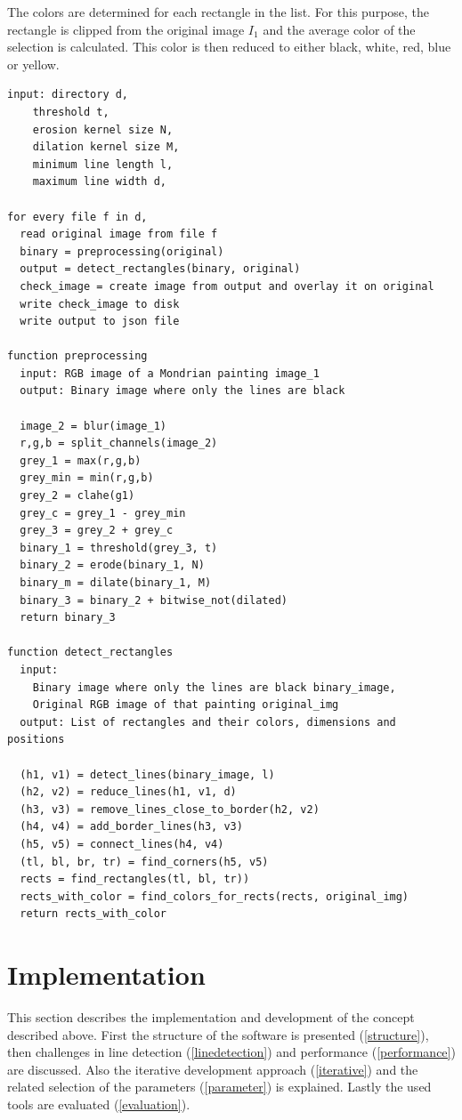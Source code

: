 \documentclass[serif,article,noparskip]{agse-thesis}
\begin{document}
The colors are determined for each rectangle in the list. For this purpose, the
rectangle is clipped from the original image $I_1$ and the average color of the
selection is calculated. This color is then reduced to either black, white, red,
blue or yellow.

\begin{lstlisting}[otherkeywords={function,input\:,output\:},label=lst:program,caption=Flow and structure of the program]
input: directory d,
    threshold t,
    erosion kernel size N,
    dilation kernel size M,
    minimum line length l,
    maximum line width d,

for every file f in d,
  read original image from file f
  binary = preprocessing(original)
  output = detect_rectangles(binary, original)
  check_image = create image from output and overlay it on original
  write check_image to disk
  write output to json file

function preprocessing
  input: RGB image of a Mondrian painting image_1
  output: Binary image where only the lines are black

  image_2 = blur(image_1)
  r,g,b = split_channels(image_2)
  grey_1 = max(r,g,b)
  grey_min = min(r,g,b)
  grey_2 = clahe(g1)
  grey_c = grey_1 - grey_min
  grey_3 = grey_2 + grey_c
  binary_1 = threshold(grey_3, t)
  binary_2 = erode(binary_1, N)
  binary_m = dilate(binary_1, M)
  binary_3 = binary_2 + bitwise_not(dilated)
  return binary_3

function detect_rectangles
  input:
    Binary image where only the lines are black binary_image,
    Original RGB image of that painting original_img
  output: List of rectangles and their colors, dimensions and positions

  (h1, v1) = detect_lines(binary_image, l)
  (h2, v2) = reduce_lines(h1, v1, d)
  (h3, v3) = remove_lines_close_to_border(h2, v2)
  (h4, v4) = add_border_lines(h3, v3)
  (h5, v5) = connect_lines(h4, v4)
  (tl, bl, br, tr) = find_corners(h5, v5)
  rects = find_rectangles(tl, bl, tr))
  rects_with_color = find_colors_for_rects(rects, original_img)
  return rects_with_color
\end{lstlisting}

\section{Implementation} \label{implementation}

This section describes the implementation and development of the concept described
above. First the structure of the software is presented (\ref{structure}),
then challenges in line detection (\ref{linedetection}) and performance
(\ref{performance}) are discussed. Also the iterative development approach
(\ref{iterative}) and the related selection of the parameters (\ref{parameter})
is explained. Lastly the used tools are evaluated (\ref{evaluation}).
\end{document}
